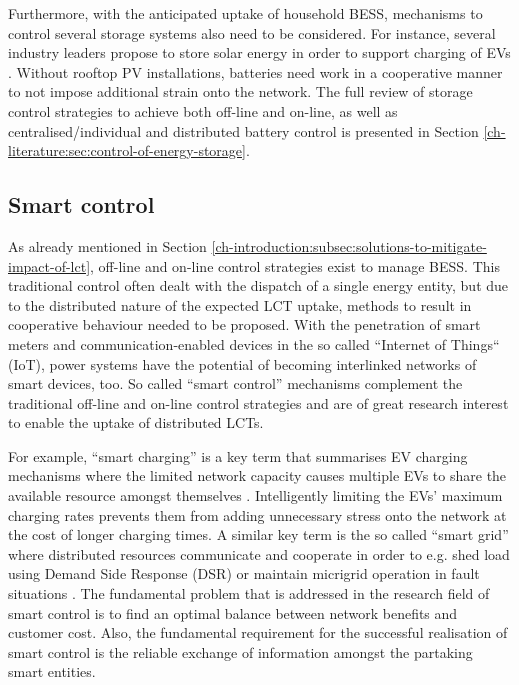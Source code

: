 Furthermore, with the anticipated uptake of household BESS, mechanisms to control several storage systems also need to be considered.
For instance, several industry leaders propose to store solar energy in order to support charging of EVs \cite{Baumann2017}.
Without rooftop PV installations, batteries need work in a cooperative manner to not impose additional strain onto the network.
The full review of storage control strategies to achieve both off-line and on-line, as well as centralised/individual and distributed battery control is presented in Section \ref{ch-literature:sec:control-of-energy-storage}.


\subsection{Smart control}
\label{ch-introduction:subsec:smart-control}


As already mentioned in Section \ref{ch-introduction:subsec:solutions-to-mitigate-impact-of-lct}, off-line and on-line control strategies exist to manage BESS.
This traditional control often dealt with the dispatch of a single energy entity, but due to the distributed nature of the expected LCT uptake, methods to result in cooperative behaviour needed to be proposed.
With the penetration of smart meters and communication-enabled devices in the so called ``Internet of Things`` (IoT), power systems have the potential of becoming interlinked networks of smart devices, too.
So called ``smart control'' mechanisms complement the traditional off-line and on-line control strategies and are of great research interest to enable the uptake of distributed LCTs.

For example, ``smart charging'' is a key term that summarises EV charging mechanisms where the limited network capacity causes multiple EVs to share the available resource amongst themselves \cite{Sortomme2011, Vaya2012, Garcia-Villalobos2014}.
Intelligently limiting the EVs' maximum charging rates prevents them from adding unnecessary stress onto the network at the cost of longer charging times.
A similar key term is the so called ``smart grid'' where distributed resources communicate and cooperate in order to e.g. shed load using Demand Side Response (DSR) or maintain micrigrid operation in fault situations \cite{Samadi2012, Liu2014, Liang2014}.
The fundamental problem that is addressed in the research field of smart control is to find an optimal balance between network benefits and customer cost.
Also, the fundamental requirement for the successful realisation of smart control is the reliable exchange of information amongst the partaking smart entities.

